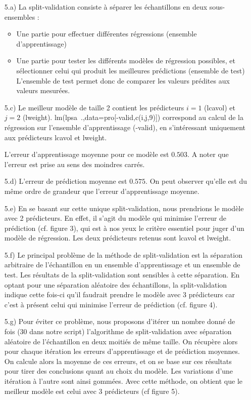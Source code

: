 \documentclass[a4paper, 12pt]{article}
\begin{document}
\begin{enumerate}
\setlength{\itemsep}{20pt}

\item[5.a)] La split-validation consiste à séparer les échantillons en deux sous-ensembles :

\begin{itemize}
\item Une partie pour effectuer différentes régressions (ensemble d'apprentissage)
\item Une partie pour tester les différents modèles de régression possibles, et sélectionner celui qui produit les meilleures prédictions (ensemble de test)
L'ensemble de test permet donc de comparer les valeurs prédites aux valeurs mesurées.
\end{itemize}

\item[5.c)] Le meilleur modèle de taille 2 contient les prédicteurs $i = 1$ (lcavol) et $j = 2$ (lweight). lm(lpsa~.,data=pro[-valid,c(i,j,9)]) correspond au calcul de la régression sur l'ensemble d'apprentissage (-valid), en s'intéressant uniquement aux prédicteurs lcavol et lweight.

L'erreur d'apprentissage moyenne pour ce modèle est $0.503$. A noter que l'erreur est prise au sens des moindres carrés.

\item[5.d)] L'erreur de prédiction moyenne est $0.575$. On peut observer qu'elle est du même ordre de grandeur que l'erreur d'apprentissage moyenne.

\item[5.e)] En se basant sur cette unique split-validation, nous prendrions le modèle avec 2 prédicteurs. En effet, il s'agit du modèle qui minimise l'erreur de prédiction (cf. figure 3), qui est à nos yeux le critère essentiel pour juger d'un modèle de régression. Les deux prédicteurs retenus sont lcavol et lweight.

\item[5.f)] Le principal problème de la méthode de split-validation est la séparation arbitraire de l'échantillon en un ensemble d'apprentissage et un ensemble de test. Les résultats de la split-validation sont sensibles à cette séparation. En optant pour une séparation aléatoire des échantillons, la split-validation indique cette fois-ci qu'il faudrait prendre le modèle avec 3 prédicteurs car c'est à présent celui qui minimise l'erreur de prédiction (cf. figure 4).

\item[5.g)] Pour éviter ce problème, nous proposons d'itérer un nombre donné de fois (30 dans notre script) l'algorithme de split-validation avec séparation aléatoire de l'échantillon en deux moitiés de même taille. On récupère alors pour chaque itération les erreurs d'apprentissage et de prédiction moyennes. On calcule alors la moyenne de ces erreurs, et on se base sur ces résultats pour tirer des conclusions quant au choix du modèle. Les variations d'une itération à l'autre sont ainsi gommées. Avec cette méthode, on obtient que le meilleur modèle est celui avec 3 prédicteurs (cf figure 5).


\end{enumerate}
\end{document}
